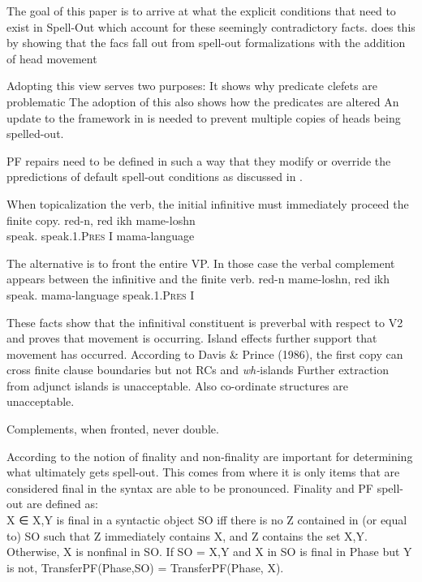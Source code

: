 \documentclass[12pt, letterpaper]{article}
\begin{document}
\ex The goal of this paper is to arrive at what the explicit conditions that need to exist in Spell-Out which account for these seemingly contradictory facts.
	\ea \citeauthor{bleamanPredicateFrontingYiddish2021} does this by showing that the facs fall out from \citet{collinsFormalizationMinimalistSyntax2016} spell-out formalizations with the addition of head movement

	\ex Adopting this view serves two purposes:
		\ea It shows why predicate clefets are problematic
		\ex The adoption of this also shows how the predicates are altered 
		\z 
	\ex An update to the framework in \citet{collinsFormalizationMinimalistSyntax2016} is needed to prevent multiple copies of heads being spelled-out. 
	\z 

\ex PF repairs need to be defined in such a way that they modify or override the ppredictions of default spell-out conditions as discussed in \citet{chomskyMinimalistProgram1995}. 

\ex When topicalization the verb, the initial infinitive must immediately proceed the finite copy. 
	\ea 
	\gll red-n, red ikh mame-loshn\\
	speak.\Inf{} speak.\textsc{1}.\textsc{Pres} I mama-language\\
	\z 

\ex The alternative is to front the entire VP. In those case the verbal complement appears between the infinitive and the finite verb. 
	\ea 
	\gll red-n mame-loshn, red ikh \\
	speak.\Inf{} mama-language speak.\textsc{1}.\textsc{Pres} I\\
	\z 

\ex These facts show that the infinitival constituent is preverbal with respect to V2 and proves that movement is occurring. 
	\ea Island effects further support that movement has occurred.
		\ea According to Davis \& Prince (1986), the first copy can cross finite clause boundaries but not RCs and \emph{wh-}islands
		\ex Further extraction from adjunct islands is unacceptable.
		\ex Also co-ordinate structures are unacceptable. 
		\z   
	\z 

\ex Complements, when fronted, never double. 

\ex According to \citeauthor{bleamanPredicateFrontingYiddish2021} the notion of finality and non-finality are important for determining what ultimately gets spell-out. 
	\ea This comes from \citet{collinsFormalizationMinimalistSyntax2016} where it is only items that are considered final in the syntax are able to be pronounced. 
	\ex Finality and PF spell-out are defined as:\\
		\ea X ∈ {X,Y} is final in a syntactic object SO iff there is no Z contained in (or equal to) SO such that Z immediately contains X, and Z contains the set {X,Y}. Otherwise, X is nonfinal in SO. 
		\ex If SO = {X,Y} and X in SO is final in Phase but Y is not, TransferPF(Phase,SO) = TransferPF(Phase, X). 
		\z 
	\z 
\end{document}
